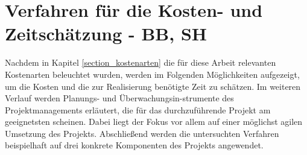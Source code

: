 
\section{Verfahren für die Kosten- und Zeitschätzung - BB, SH}
\label{section_verfahren_schaetzung} %
Nachdem in Kapitel \ref{section_kostenarten} die für diese Arbeit relevanten Kostenarten 
beleuchtet wurden, werden im Folgenden Möglichkeiten aufgezeigt, um die Kosten 
und die zur Realisierung benötigte Zeit zu schätzen. Im weiteren Verlauf werden 
Planungs- und Überwachungsin-strumente des Projektmanagements erläutert, die für 
das durchzuführende Projekt am geeignetsten scheinen. Dabei liegt der Fokus vor 
allem auf einer möglichst agilen Umsetzung des Projekts. Abschließend werden 
die untersuchten Verfahren beispielhaft auf drei konkrete Komponenten des Projekts 
angewendet.





